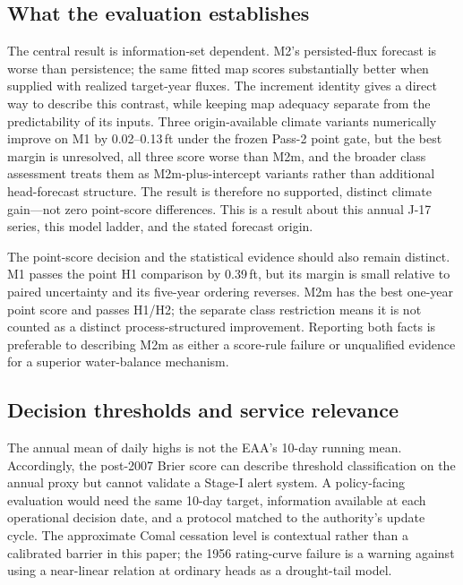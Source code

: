\documentclass[11pt]{article}
\begin{document}
\subsection{What the evaluation establishes}

The central result is information-set dependent. M2's persisted-flux forecast is worse than persistence; the same fitted map scores substantially better when supplied with realized target-year fluxes. The increment identity gives a direct way to describe this contrast, while keeping map adequacy separate from the predictability of its inputs. Three origin-available climate variants numerically improve on M1 by 0.02--0.13\,ft under the frozen Pass-2 point gate, but the best margin is unresolved, all three score worse than M2m, and the broader class assessment treats them as M2m-plus-intercept variants rather than additional head-forecast structure. The result is therefore no supported, distinct climate gain—not zero point-score differences. This is a result about this annual J-17 series, this model ladder, and the stated forecast origin.

The point-score decision and the statistical evidence should also remain distinct. M1 passes the point H1 comparison by 0.39\,ft, but its margin is small relative to paired uncertainty and its five-year ordering reverses. M2m has the best one-year point score and passes H1/H2; the separate class restriction means it is not counted as a distinct process-structured improvement. Reporting both facts is preferable to describing M2m as either a score-rule failure or unqualified evidence for a superior water-balance mechanism.

\subsection{Decision thresholds and service relevance}

The annual mean of daily highs is not the EAA's 10-day running mean. Accordingly, the post-2007 Brier score can describe threshold classification on the annual proxy but cannot validate a Stage-I alert system. A policy-facing evaluation would need the same 10-day target, information available at each operational decision date, and a protocol matched to the authority's update cycle. The approximate Comal cessation level is contextual rather than a calibrated barrier in this paper; the 1956 rating-curve failure is a warning against using a near-linear relation at ordinary heads as a drought-tail model.
\end{document}

